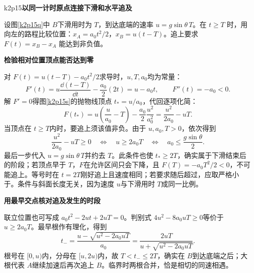 \LectureAnswerSection

\begin{drillsolution}{k2p15}\textbf{以同一计时原点连接下滑和水平追及}\par\nobreak
设图\ref{k2p15q}中 $B$下滑用时为 $T$，到达底端的速率 $u=g\sin\theta\,T$。在 $t\ge T$ 时，用向左的路程比较位置：$x_A=a_0t^2/2$，$x_B=u(t-T)$。追上要求 $F(t)=x_B-x_A$ 能达到非负值。


\par\medskip{}\noindent\textbf{检验相对位置顶点能否达到零}\par\nobreak
对 $F(t)=u(t-T)-a_0t^2/2$求导时，$u,T,a_0$均为常量：
\[
 F'(t)=u\frac{\dd(t-T)}{\dd t}-\frac{a_0}{2}(2t)=u-a_0t,
 \qquad F''(t)=-a_0<0.
\]
解 $F'=0$得图\ref{k2p15s}的抛物线顶点 $t_*=u/a_0$，代回逐项化简：
\[
 F(t_*)=u\left(\frac u{a_0}-T\right)
 -\frac{a_0}{2}\frac{u^2}{a_0^2}
 =\frac{u^2}{2a_0}-uT.
\]
当顶点在 $t\ge T$内时，要追上须该值非负。由于 $u,a_0,T>0$，依次得到
\[
 \frac{u^2}{2a_0}-uT\ge0
 \quad\Longleftrightarrow\quad u\ge2a_0T
 \quad\Longleftrightarrow\quad
 \boxed{a_0\le\frac{g\sin\theta}{2}}.
\]
最后一步代入 $u=g\sin\theta\,T$并约去 $T$。此条件也使 $t_*\ge2T$，确实属于下滑结束后的阶段；若顶点早于 $T$，$F$在允许区间只会下降，且 $F(T)=-a_0T^2/2<0$，不可能追上。等号时在 $t=2T$刚好追上且速度相同；若要求随后超过，应取严格小于。条件与斜面长度无关，因为速度 $u$与下滑用时 $T$成同一比例。



\par\medskip{}\noindent\textbf{用最早交点核对追及发生的时段}\par\nobreak
联立位置也可写成 $a_0t^2-2ut+2uT=0$。判别式 $4u^2-8a_0uT\ge0$等价于 $u\ge2a_0T$。最早根作有理化，得到
\[
 t_- =\frac{u-\sqrt{u^2-2a_0uT}}{a_0}
 =\frac{2uT}{u+\sqrt{u^2-2a_0uT}}.
\]
根号在 $[0,u)$内，分母在 $[u,2u)$内，故 $T<t_-\le2T$，确实在 $B$到达底端之后；大根代表 $A$继续加速后再次追上 $B$。临界时两根合并，恰是相切的同速相遇。\end{drillsolution}

